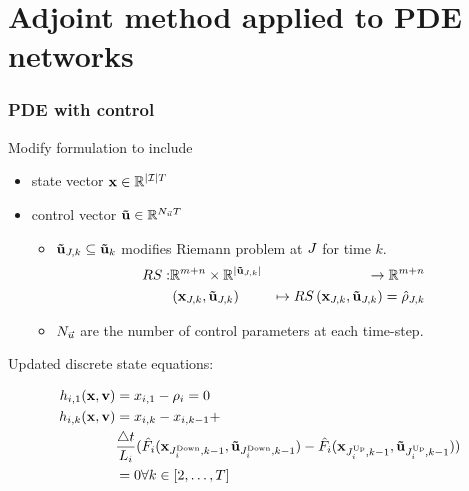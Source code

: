 \section[network adjoint]{Adjoint method applied to PDE networks} %
\label{sec:adjoint_method_applied_to_pde_networks}




\begin{frame}[t]\frametitle{PDE with control}

Modify formulation to include

\begin{itemize}
    \item state vector $\mathbf{x}\in\mathbb{R}^{|\mathcal{I}|T}$
    \item control vector $\mathbf{\vec{u}}\in\mathbb{R}^{N_{\vec{u}}T}$
    \begin{itemize}
        \item $\mathbf{\vec{u}}_{J,k}\subseteq\mathbf{\vec{u}}_{k}$ modifies Riemann problem at $J$ for time $k$.
        \begin{align}
            RS:&\mathbb{R}^{m+n}\times\mathbb{R}^{|\mathbf{\vec{u}}_{J,k}|}&\rightarrow\mathbb{R}^{m+n}\\&\left(\mathbf{x}_{J,k},\mathbf{\vec{u}}_{J,k}\right)&\mapsto RS\left(\mathbf{x}_{J,k},\mathbf{\vec{u}}_{J,k}\right)=\hat{\mathbf{\rho}}_{J,k}
        \end{align}
        \item $N_{\vec{u}}$ are the number of control parameters at each time-step.
    \end{itemize}
\end{itemize}

Updated discrete state equations:

\begin{align}
h_{i,1}(\mathbf{x},\mathbf{v})&=x_{i,1}-\rho_{i}=0\\
h_{i,k}(\mathbf{x},\mathbf{v})&=x_{i,k}-x_{i,k-1}+\\
&\frac{\triangle t}{L_{i}}(\hat{F}_{i}(\mathbf{x}_{J_{i}^{\text{Down}},k-1},\mathbf{\vec{u}}_{J_{i}^{\text{Down}},k-1})-\hat{F}_{i}(\mathbf{x}_{J_{i}^{\text{Up}},k-1},\mathbf{\vec{u}}_{J_{i}^{\text{Up}},k-1}))\\
&=0\forall k\in\left[2,\ldots,T\right]
\end{align}

\end{frame}

